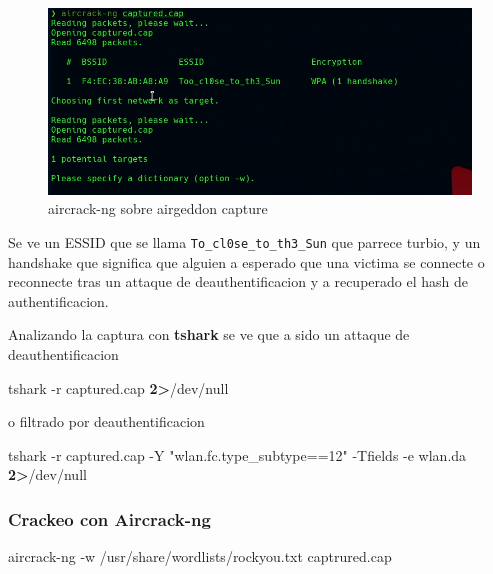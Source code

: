 \documentclass{assets/ipesethesis}
\newenvironment{Shaded}{\begin{snugshade}}{\end{snugshade}}
\newcommand{\ExtensionTok}[1]{#1}
\newcommand{\NormalTok}[1]{#1}
\newcommand{\OperatorTok}[1]{\textcolor[rgb]{0.81,0.36,0.00}{\textbf{#1}}}
\newcommand{\StringTok}[1]{\textcolor[rgb]{0.31,0.60,0.02}{#1}}
\begin{document}
\begin{figure}
\includegraphics[width=0.9\linewidth]{images/aircrack-airgeddon} \caption{aircrack-ng sobre airgeddon capture}\label{fig:unnamed-chunk-3}
\end{figure}

Se ve un ESSID que se llama \texttt{To\_cl0se\_to\_th3\_Sun} que parrece turbio, y un handshake que significa que alguien a esperado que una victima se connecte
o reconnecte tras un attaque de deauthentificacion y a recuperado el hash de authentificacion.

Analizando la captura con \textbf{tshark} se ve que a sido un attaque de deauthentificacion

\begin{Shaded}
\begin{Highlighting}[]
\ExtensionTok{tshark}\NormalTok{ -r captured.cap }\OperatorTok{2>}\NormalTok{/dev/null}
\end{Highlighting}
\end{Shaded}

o filtrado por deauthentificacion

\begin{Shaded}
\begin{Highlighting}[]
\ExtensionTok{tshark}\NormalTok{ -r captured.cap -Y }\StringTok{"wlan.fc.type_subtype==12"}\NormalTok{ -Tfields -e wlan.da }\OperatorTok{2>}\NormalTok{/dev/null}
\end{Highlighting}
\end{Shaded}

\hypertarget{crackeo-con-aircrack-ng}{%
\subsubsection*{Crackeo con Aircrack-ng}\label{crackeo-con-aircrack-ng}}

\begin{Shaded}
\begin{Highlighting}[]
\ExtensionTok{aircrack-ng}\NormalTok{ -w /usr/share/wordlists/rockyou.txt captrured.cap}
\end{Highlighting}
\end{Shaded}
\end{document}
